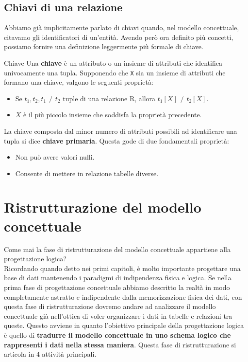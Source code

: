 \documentclass[12pt]{report}
\begin{document}
	\subsection{Chiavi di una relazione}
	Abbiamo già implicitamente parlato di chiavi quando, nel modello concettuale, citavamo gli identificatori di un'entità. Avendo però ora definito più concetti, possiamo fornire una definizione leggermente più formale di chiave.
	\begin{definizione}{Chiave}{}
		Una \textbf{chiave} è un attributo o un insieme di attributi che identifica univocamente una tupla.
		\smallbreak
		Supponendo che \texttt{X} sia un insieme di attributi che formano una chiave, valgono le seguenti proprietà:
		\begin{itemize}
			\item Se $t_1, t_2, t_1 \neq t_2$ tuple di una relazione R, allora $t_1[X] \neq t_2[X]$.
			
			\item $X$ è il più piccolo insieme che soddisfa la proprietà precedente.
		\end{itemize}
	\end{definizione}
	La chiave composta dal minor numero di attributi possibili ad identificare una tupla si dice \textbf{chiave primaria}.
	Questa gode di due fondamentali proprietà:
	\begin{itemize}
		\item Non può avere valori nulli.
		
		\item Consente di mettere in relazione tabelle diverse.
	\end{itemize}
	
	\section{Ristrutturazione del modello concettuale}
	Come mai la fase di ristrutturazione del modello concettuale appartiene alla progettazione logica?\\
	Ricordando quando detto nei primi capitoli, è molto importante progettare una base di dati mantenendo i paradigmi di indipendenza fisica e logica. Se nella prima fase di progettazione concettuale abbiamo descritto la realtà in modo completamente astratto e indipendente dalla memorizzazione fisica dei dati, con questa fase di ristrutturazione dovremo andare ad analizzare il modello concettuale già nell'ottica di voler organizzare i dati in tabelle e relazioni tra queste.
	Questo avviene in quanto l'obiettivo principale della progettazione logica è quello di \textbf{tradurre il modello concettuale in uno schema logico che rappresenti i dati nella stessa maniera}.
	\small
	Questa fase di ristrutturazione si articola in 4 attività principali.
	
\end{document}
